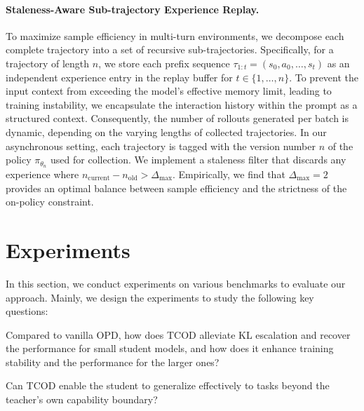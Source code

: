 \documentclass{article} %
\newcommand{\ours}{TCOD\xspace}
\begin{document}
\paragraph{Staleness-Aware Sub-trajectory Experience Replay.}
To maximize sample efficiency in multi-turn environments, we decompose each complete trajectory into a set of recursive sub-trajectories. Specifically, for a trajectory of length $n$, we store each prefix sequence $\tau_{1:t} = (s_0, a_0, \dots, s_t)$ as an independent experience entry in the replay buffer for $t \in \{1, \dots, n\}$. 
To prevent the input context from exceeding the model's effective memory limit, leading to training instability, 
we encapsulate the interaction history within the prompt as a structured context.
Consequently, the number of rollouts generated per batch is dynamic, depending on the varying lengths of collected trajectories. 
In our asynchronous setting, each trajectory is tagged with the version number $n$ of the policy $\pi_{\theta_n}$ used for collection. 
We implement a staleness filter that discards any experience where $n_{\text{current}} - n_{\text{old}} > \Delta_{\text{max}}$.
Empirically, we find that $\Delta_{\text{max}} = 2$ provides an optimal balance between sample efficiency and the strictness of the on-policy constraint.


\section{Experiments}

In this section, we conduct experiments on various benchmarks to evaluate our approach. Mainly, we design the experiments to study the following key questions:


 Compared to vanilla OPD, how does \ours 
alleviate KL escalation and recover the performance for small student models, and how does it enhance training stability and the performance for the larger ones?

 Can \ours enable the student to generalize effectively to tasks beyond the teacher's own capability boundary?
\end{document}
